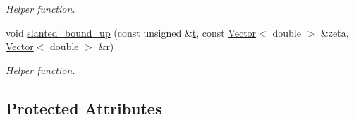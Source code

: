 \begin{DoxyCompactItemize}
\begin{DoxyCompactList}\small\item\em Helper function. \end{DoxyCompactList}\item 
void \hyperlink{classoomph_1_1ChannelWithLeafletDomain_aaca0af9c2a638c80bd8af783b9972599}{slanted\+\_\+bound\+\_\+up} (const unsigned \&\hyperlink{cfortran_8h_af6f0bd3dc13317f895c91323c25c2b8f}{t}, const \hyperlink{classoomph_1_1Vector}{Vector}$<$ double $>$ \&zeta, \hyperlink{classoomph_1_1Vector}{Vector}$<$ double $>$ \&r)
\begin{DoxyCompactList}\small\item\em Helper function. \end{DoxyCompactList}\end{DoxyCompactItemize}
\subsection*{Protected Attributes}
